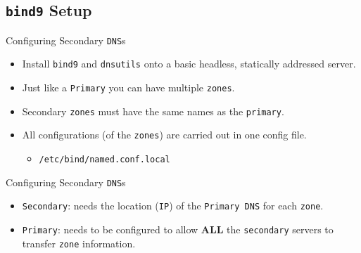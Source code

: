 \documentclass[xcolor=table,aspectratio=169]{beamer}
\begin{document}
\subsection{\texttt{bind9} Setup}
\begin{frame}{Configuring Secondary \texttt{DNS}s}
  \begin{itemize}
    \item Install \texttt{bind9} and \texttt{dnsutils} onto a basic headless, statically addressed server.
    \item Just like a \texttt{Primary} you can have multiple \texttt{zones}.
    \item Secondary \texttt{zones} must have the same names as the \texttt{primary}.
    \item All configurations (of the \texttt{zones}) are carried out in one config file.
      \begin{itemize}
        \item \texttt{/etc/bind/named.conf.local}
      \end{itemize}
  \end{itemize}
\end{frame}

\begin{frame}{Configuring Secondary \texttt{DNS}s}
  \begin{itemize}
    \item \texttt{Secondary}: needs the location (\texttt{IP}) of the \texttt{Primary DNS} for each \texttt{zone}.
    \item \texttt{Primary}: needs to be configured to allow \textbf{ALL} the \texttt{secondary} servers to transfer \texttt{zone} information.
  \end{itemize}
\end{frame}
\end{document}
